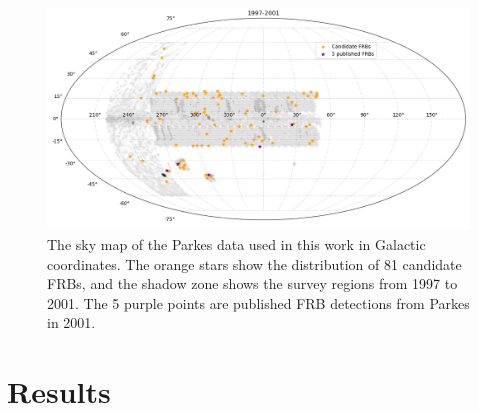 \documentclass[fleqn,usenatbib]{mnras}
\begin{document}
\begin{figure}
	\includegraphics[width=\textwidth]{pic/all_map97.png}
    \caption{
    The sky map of the Parkes data used in this work in Galactic coordinates. 
    The orange stars show the distribution of 81 candidate FRBs, and the shadow zone shows the survey regions from 1997 to 2001. The 5 purple points are published FRB detections from Parkes in 2001.}
    \label{fig:3}
\end{figure}


\section{Results}


\label{sec:result}
\end{document}
